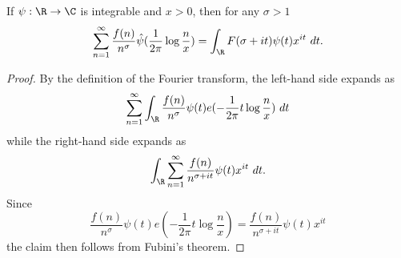 \begin{lemma}
\label{first-fourier}
\leanok
If $\psi: \R \to \C$ is integrable and $x > 0$, then for any $\sigma>1$
  $$ \sum_{n=1}^\infty \frac{f(n)}{n^\sigma} \hat \psi( \frac{1}{2\pi} \log \frac{n}{x} ) =
  \int_\R F(\sigma + it) \psi(t) x^{it}\ dt.$$
\end{lemma}
\begin{proof}
\leanok
By the definition of the Fourier transform, the left-hand side expands as
  $$ \sum_{n=1}^\infty \int_\R \frac{f(n)}{n^\sigma} \psi(t) e( - \frac{1}{2\pi} t \log
  \frac{n}{x})\ dt$$
  while the right-hand side expands as
  $$ \int_\R \sum_{n=1}^\infty \frac{f(n)}{n^{\sigma+it}} \psi(t) x^{it}\ dt.$$
  Since
  $$\frac{f(n)}{n^\sigma} \psi(t) e( - \frac{1}{2\pi} t \log \frac{n}{x}) =
  \frac{f(n)}{n^{\sigma+it}} \psi(t) x^{it}$$
  the claim then follows from Fubini's theorem.
\end{proof}
